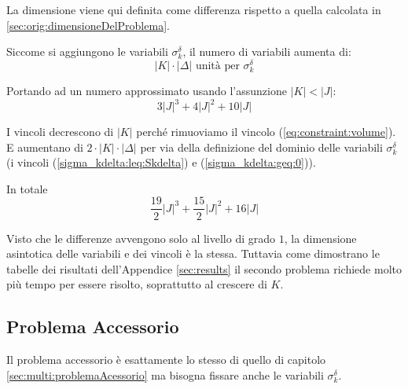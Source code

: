 La dimensione viene qui definita come differenza rispetto a quella calcolata in
\ref{sec:orig:dimensioneDelProblema}.

Siccome si aggiungono le variabili $\sigma_k^\delta$, 
il numero di variabili aumenta di:
$$
|K|\cdot|\Delta| \text{ unità per } \sigma_k^\delta
$$

Portando ad un numero approssimato usando l'assunzione $|K| < |J|$:
$$
3|J|^3 + 4|J|^2 + 10|J|
$$


I vincoli decrescono di $|K|$ perché rimuoviamo il vincolo
(\ref{eq:constraint:volume}). E aumentano di $2 \cdot |K|\cdot|\Delta|$ per via
della definizione del dominio delle variabili $\sigma_k^\delta$
(i vincoli (\ref{sigma_kdelta:leq:Skdelta}) e (\ref{sigma_kdelta:geq:0})).

In totale
$$
\frac{19}{2}|J|^3 + \frac{15}{2}|J|^2 + 16|J|
$$


Visto che le differenze avvengono solo al livello di grado $1$, la
dimensione asintotica delle variabili e dei vincoli è la stessa.
Tuttavia come dimostrano le tabelle dei risultati dell'Appendice \ref{sec:results}
il secondo problema richiede molto più tempo per essere risolto, soprattutto al
crescere di $K$.


\subsection{Problema Accessorio}

Il problema accessorio è esattamente lo stesso di quello di capitolo 
\ref{sec:multi:problemaAcessorio} ma bisogna fissare anche le variabili
$\sigma_k^\delta$.



